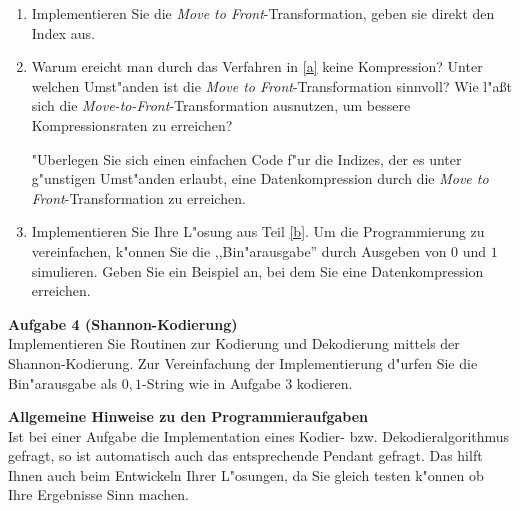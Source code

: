 \documentclass[a4paper]{article}
\begin{document}
\begin{enumerate}
\item\label{a} Implementieren Sie die {\em Move to Front}-Transformation, geben sie direkt den Index aus.
\item\label{b} Warum ereicht man durch das Verfahren in \ref{a} keine Kompression? Unter welchen Umst"anden ist die {\em Move to Front}-Transformation sinnvoll? Wie l"a{\ss}t sich die {\em Move-to-Front}-Transformation ausnutzen, um bessere Kompressionsraten zu erreichen?

"Uberlegen Sie sich einen einfachen Code f"ur die Indizes, der es unter g"unstigen Umst"anden erlaubt, eine Datenkompression durch die {\em Move to Front}-Transformation zu erreichen.
\item Implementieren Sie Ihre L"osung aus Teil \ref{b}. Um die Programmierung zu vereinfachen, k"onnen Sie die ,,Bin"arausgabe'' durch Ausgeben von $0$ und $1$ simulieren. Geben Sie ein Beispiel an, bei dem Sie eine Datenkompression erreichen. 
\end{enumerate}




\bigskip

{\bf Aufgabe 4  \quad(Shannon-Kodierung)}\smallskip\\
Implementieren Sie Routinen zur Kodierung und Dekodierung mittels der Shannon-Kodierung. Zur Vereinfachung der Implementierung d"urfen Sie die Bin"arausgabe als $0,1$-String wie in Aufgabe 3 kodieren.

\bigskip

{\bf Allgemeine Hinweise zu den Programmieraufgaben}\\
Ist bei einer Aufgabe die Implementation eines Kodier- bzw. Dekodieralgorithmus gefragt, so ist automatisch auch das entsprechende Pendant gefragt. Das hilft Ihnen auch beim Entwickeln Ihrer L"osungen, da Sie gleich testen k"onnen ob Ihre Ergebnisse Sinn machen.
\end{document}
